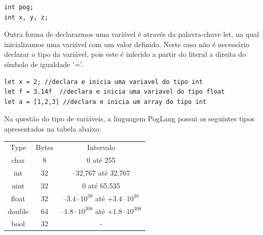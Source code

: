 \documentclass[12pt, letterpaper]{article}
\newcommand\tab[1][1cm]{\hspace*{#1}}
\begin{document}
\begin{lstlisting}[caption=Exemplo declaração de variáveis]
int pog;
int x, y, z;
\end{lstlisting}

\begin{spacing}{1.5}
\end{spacing}

\tab Outra forma de declararmos uma variável é através da palavra-chave let, na qual inicializamos uma variável 
com um valor definido. Neste caso não é necessário declarar o tipo da variável, pois este é inferido a partir do 
literal a direita do símbolo de igualdade '='. 

\begin{spacing}{1.5}
\end{spacing}

\begin{lstlisting}[caption=Exemplo inicialização com palavra-chave let]
let x = 2; //declara e inicia uma variavel do tipo int
let f = 3.14f  //declara e inicia uma variavel do tipo float
let a = [1,2,3] //declara e inicia um array do tipo int
\end{lstlisting}

\begin{spacing}{1.5}
\end{spacing}

\tab Na questão do tipo de variáveis, a linguagem PogLang possui os seguintes tipos apresentados na tabela abaixo:

\begin{spacing}{1.5}
\end{spacing}

\begin{center}
\begin{tabular}{c c c}
Type & Bytes & Intervalo \\
char & 8 & 0 até 255 \\
int & 32 & –32,767 até 32,767 \\
uint & 32 & 0 até 65,535 \\
float & 32 & $–3.4 \cdot 10^{38}$ até $+3.4 \cdot 10^{38}$ \\
double & 64 & $–1.8 \cdot 10^{308}$ até $+1.8 \cdot 10^{308}$ \\
bool & 32 & - \\
\end{tabular}
\end{center}

\begin{spacing}{1.5}
\end{spacing}
\end{document}
